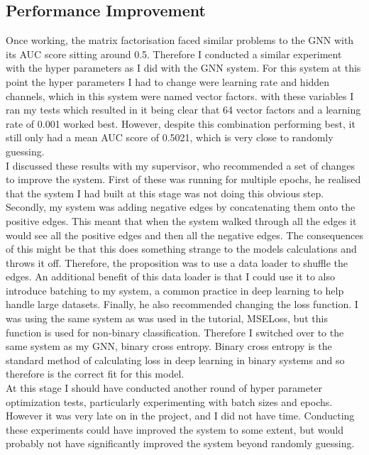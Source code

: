 \documentclass{l4proj}
\begin{document}
\subsection{Performance Improvement}

Once working, the matrix factorisation faced similar problems to the GNN with its AUC score sitting around 0.5. Therefore I conducted a similar experiment with the hyper parameters as I did with the GNN system. For this system at this point the hyper parameters I had to change were learning rate and hidden channels, which in this system were named vector factors. with these variables I ran my tests which resulted in it being clear that 64 vector factors and a learning rate of 0.001 worked best. However, despite this combination performing best, it still only had a mean AUC score of 0.5021, which is very close to randomly guessing. \\

I discussed these results with my supervisor, who recommended a set of changes to improve the system. First of these was running for multiple epochs, he realised that the system I had built at this stage was not doing this obvious step. Secondly, my system was adding negative edges by concatenating them onto the positive edges. This meant that when the system walked through all the edges it would see all the positive edges and then all the negative edges. The consequences of this might be that this does something strange to the models calculations and throws it off. Therefore, the proposition was to use a data loader to shuffle the edges. An additional benefit of this data loader is that I could use it to also introduce batching to my system, a common practice in deep learning to help handle large datasets. Finally, he also recommended changing the loss function. I was using the same system as was used in the tutorial, MSELoss, but this function is used for non-binary classification. Therefore I switched over to the same system as my GNN, binary cross entropy. Binary cross entropy is the standard method of calculating loss in deep learning in binary systems and so therefore is the correct fit for this model.\\

At this stage I should have conducted another round of hyper parameter optimization tests, particularly experimenting with batch sizes and epochs. However it was very late on in the project, and I did not have time. Conducting these experiments could have improved the system to some extent, but would probably not have significantly improved the system beyond randomly guessing. \\
\end{document}
